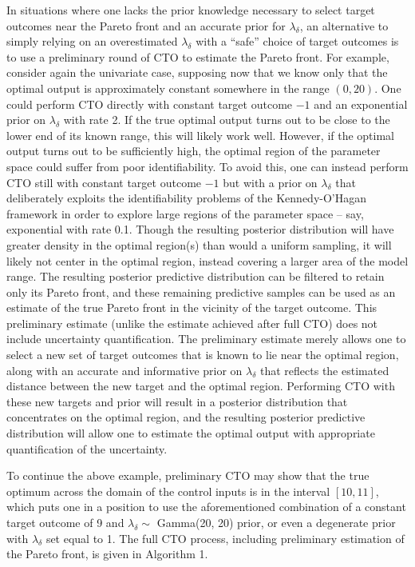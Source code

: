 \documentclass[12pt]{article}
\begin{document}
%
In situations where one lacks the prior knowledge necessary to select target outcomes near the Pareto front and an accurate prior for $\lambda_\delta$, an alternative to simply relying on an overestimated $\lambda_\delta$ with a ``safe'' choice of target outcomes is to use a preliminary round of CTO to estimate the Pareto front.
%
For example, consider again the univariate case, supposing now that we know only that the optimal output is approximately constant somewhere in the range $(0,20)$. 
%
One could perform CTO directly with constant target outcome $-1$ and an exponential prior on $\lambda_\delta$ with rate 2.
%
If the true optimal output turns out to be close to the lower end of its known range, this will likely work well.
%
However, if the optimal output turns out to be sufficiently high, the optimal region of the parameter space could suffer from poor identifiability.
%
To avoid this, one can instead perform CTO still with constant target outcome $-1$ but with a prior on $\lambda_\delta$ that deliberately exploits the identifiability problems of the Kennedy-O'Hagan framework in order to explore large regions of the parameter space -- say, exponential with rate 0.1.
% 
Though the resulting posterior distribution will have greater density in the optimal region(s) than would a uniform sampling, it will likely not center in the optimal region, instead covering a larger area of the model range.
%
The resulting posterior predictive distribution can be filtered to retain only its Pareto front, and these remaining predictive samples can be used as an estimate of the true Pareto front in the vicinity of the target outcome.
%
This preliminary estimate (unlike the estimate achieved after full CTO) does not include uncertainty quantification. 
%
The preliminary estimate merely allows one to select a new set of target outcomes that is known to lie near the optimal region, along with an accurate and informative prior on $\lambda_\delta$ that reflects the estimated distance between the new target and the optimal region.
%
Performing CTO with these new targets and prior will result in a posterior distribution that concentrates on the optimal region, and the resulting posterior predictive distribution will allow one to estimate the optimal output with appropriate quantification of the uncertainty.
%

To continue the above example, preliminary CTO may show that the true optimum across the domain of the control inputs is in the interval $[10,11]$, which puts one in a position to use the aforementioned combination of a constant target outcome of 9 and $\lambda_\delta\sim$ Gamma(20, 20) prior, or even a degenerate prior with $\lambda_\delta$ set equal to 1.
%
The full CTO process, including preliminary estimation of the Pareto front, is given in Algorithm 1.
\end{document}
